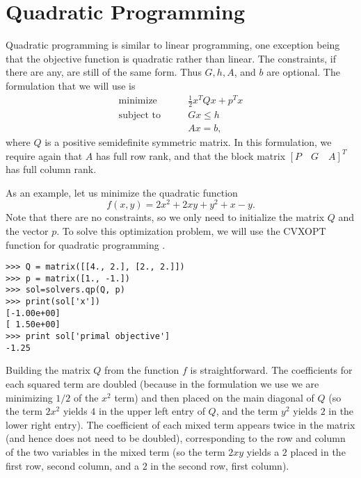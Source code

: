 \begin{comment}
>>> h = matrix([ 0., 0., 0., 0., 0., 0.,])
>>> o = matrix([4., 7., 6., 8., 8., 9])
>>> A = matrix([ [1., 0., 0., 1., 0.],
             [1., 0., 0., 0., 1.],
             [0., 1., 0., 1., 0.],
             [0., 1., 0., 0., 1.],
             [0., 0., 1., 1., 0.],
             [0., 0., 1., 0., 1.] ])
>>> b = matrix([7., 2., 4., 5., 8])
>>> sol = glpk.ilp(o,G,h,A,b)
>>> print sol[1]
\end{lstlisting}

\textbf{Problem 2}
Choose one of these methods and compare the optimal values for the integer linear program to the result you received above.

\textbf{Problem 3}
Create the dual problem for the linear program and solve.
Compare your answer to the dual value cvxopt returned.
\end{comment}

\section*{Quadratic Programming}

Quadratic programming is similar to linear programming, one exception being that the objective function is quadratic rather than linear.
The constraints, if there are any, are still of the same form.
Thus $G, h, A$, and $b$ are optional. The formulation that we will use is
\begin{align*}
\text{minimize}\qquad &\frac{1}{2}x^TQx + p^Tx \\
\text{subject to}\qquad &Gx \leq h\\
 &Ax = b,
\end{align*}
where $Q$ is a positive semidefinite symmetric matrix.
In this formulation, we require again that $A$ has full row rank, and that the block matrix
$[P \quad G \quad A]^T$ has full column rank.

As an example, let us minimize the quadratic function
\[
f(x,y) = 2x^2 +2xy + y^2 +x -y.
\]
Note that there are no constraints, so we only need to initialize the matrix $Q$ and the vector $p$.
To solve this optimization problem, we will use the CVXOPT function for quadratic programming .
\begin{lstlisting}
>>> Q = matrix([[4., 2.], [2., 2.]])
>>> p = matrix([1., -1.])
>>> sol=solvers.qp(Q, p)
>>> print(sol['x'])
[-1.00e+00]
[ 1.50e+00]
>>> print sol['primal objective']
-1.25
\end{lstlisting}
Building the matrix $Q$ from the function $f$ is straightforward. The coefficients for each squared term are doubled (because in the formulation we use we are minimizing $1/2$ of the $x^2$ term) and then placed on the main diagonal of $Q$ (so the term $2x^2$ yields $4$ in the upper left entry of
$Q$, and the term $y^2$ yields $2$ in the lower right entry).
The coefficient of each mixed term appears twice in the matrix (and hence does not need to be doubled), corresponding to the row and column of the two variables in the mixed term (so the term $2xy$ yields a $2$ placed in the first row, second column, and a $2$ in
the second row, first column). 

